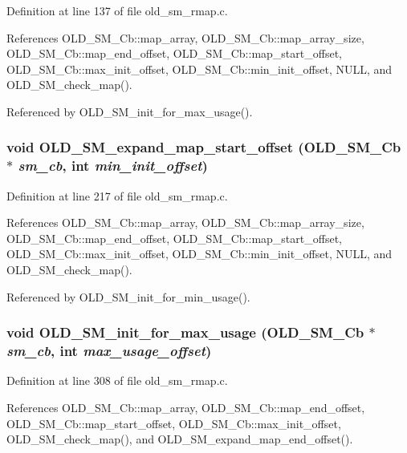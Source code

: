 Definition at line 137 of file old\_\-sm\_\-rmap.c.

References OLD\_\-SM\_\-Cb::map\_\-array, OLD\_\-SM\_\-Cb::map\_\-array\_\-size, OLD\_\-SM\_\-Cb::map\_\-end\_\-offset, OLD\_\-SM\_\-Cb::map\_\-start\_\-offset, OLD\_\-SM\_\-Cb::max\_\-init\_\-offset, OLD\_\-SM\_\-Cb::min\_\-init\_\-offset, NULL, and OLD\_\-SM\_\-check\_\-map().

Referenced by OLD\_\-SM\_\-init\_\-for\_\-max\_\-usage().
\subsubsection{\setlength{\rightskip}{0pt plus 5cm}void OLD\_\-SM\_\-expand\_\-map\_\-start\_\-offset (\bf{OLD\_\-SM\_\-Cb} $\ast$ {\em sm\_\-cb}, int {\em min\_\-init\_\-offset})}\label{old__sm__rmap_8c_ae011071b72f337e045a87caf9cd2fda}




Definition at line 217 of file old\_\-sm\_\-rmap.c.

References OLD\_\-SM\_\-Cb::map\_\-array, OLD\_\-SM\_\-Cb::map\_\-array\_\-size, OLD\_\-SM\_\-Cb::map\_\-end\_\-offset, OLD\_\-SM\_\-Cb::map\_\-start\_\-offset, OLD\_\-SM\_\-Cb::max\_\-init\_\-offset, OLD\_\-SM\_\-Cb::min\_\-init\_\-offset, NULL, and OLD\_\-SM\_\-check\_\-map().

Referenced by OLD\_\-SM\_\-init\_\-for\_\-min\_\-usage().
\subsubsection{\setlength{\rightskip}{0pt plus 5cm}void OLD\_\-SM\_\-init\_\-for\_\-max\_\-usage (\bf{OLD\_\-SM\_\-Cb} $\ast$ {\em sm\_\-cb}, int {\em max\_\-usage\_\-offset})}\label{old__sm__rmap_8c_0dcd9031ad45b544fdf36bd029baaa00}




Definition at line 308 of file old\_\-sm\_\-rmap.c.

References OLD\_\-SM\_\-Cb::map\_\-array, OLD\_\-SM\_\-Cb::map\_\-end\_\-offset, OLD\_\-SM\_\-Cb::map\_\-start\_\-offset, OLD\_\-SM\_\-Cb::max\_\-init\_\-offset, OLD\_\-SM\_\-check\_\-map(), and OLD\_\-SM\_\-expand\_\-map\_\-end\_\-offset().

